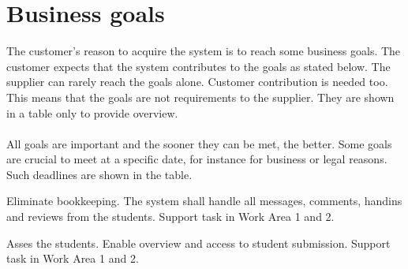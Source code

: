 \documentclass[Main]{subfiles}
\begin{document}
\section{Business goals}
The customer's reason to acquire the system is to reach some business goals. 
The customer expects that the system contributes to the goals as stated below. 
The supplier can rarely reach the goals alone. 
Customer contribution is needed too. 
This means that the goals are not requirements to the supplier. 
They are shown in a table only to provide overview. 
\\
\\
All goals are important and the sooner they can be met, the better. 
Some goals are crucial to meet at a specific date, for instance for business or legal reasons. 
Such deadlines are shown in the table.

\begin{GoalTable}

\Goal
{Eliminate bookkeeping.}
{The system shall handle all messages, comments, handins and reviews from the students.}
{Support task in Work Area 1 and 2.}
{}


\Goal
{Asses the students.}
{Enable overview and access to student submission.}
{Support task in Work Area 1 and 2.}
{}


\end{GoalTable}
\end{document}

